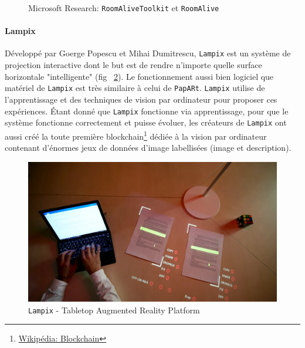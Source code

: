 \begin{figure}[H]
    \centering
\caption{Microsoft Research: \texttt{RoomAliveToolkit} et \texttt{RoomAlive}\protect\footnotemark}
\label{fig:roomalive}
\end{figure}

\paragraph{Lampix} Développé par Goerge Popescu et Mihai Dumitrescu, \texttt{Lampix} est un système de projection interactive dont le but est de rendre n'importe quelle surface horizontale "intelligente" (fig ~\ref{fig:lampix}). Le fonctionnement aussi bien logiciel que matériel de \texttt{Lampix} est très similaire à celui de \texttt{\texttt{PapARt}}. \texttt{Lampix} utilise de l'apprentissage et des techniques de vision par ordinateur pour proposer ces expériences. Étant donné que \texttt{Lampix} fonctionne via apprentissage, pour que le système fonctionne correctement et puisse évoluer, les créateurs de \texttt{Lampix} ont aussi créé la toute première blockchain\footnote{\href{https://fr.wikipedia.org/wiki/Blockchain}{Wikipédia: Blockchain}} dédiée à la vision par ordinateur contenant d'énormes jeux de données d'image labellisées (image et description).
     
\begin{figure}[H]
\centering
\includegraphics[width=0.7\linewidth]{images/lampix}
\caption{\texttt{Lampix} - Tabletop Augmented Reality Platform}
\label{fig:lampix}
\end{figure} 